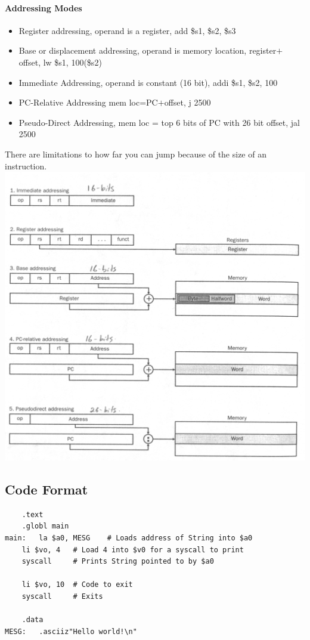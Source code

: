 \documentclass[12 pt]{article}
\begin{document}
\paragraph{Addressing Modes}
\begin{itemize}
\item Register addressing, operand is a register, add \$s1, \$s2, \$s3
\item Base or displacement addressing, operand is memory location, register$+$ offset, lw \$s1, 100(\$s2)
\item Immediate Addressing, operand is constant (16 bit), addi \$s1, \$s2, 100
\item PC-Relative Addressing mem loc=PC$+$offset, j 2500
\item Pseudo-Direct Addressing, mem loc = top 6 bits of PC with 26 bit offset, jal 2500 
\end{itemize}
There are limitations to how far you can jump because of the size of an instruction.
\\ \includegraphics[scale=0.3]{am}
\subsection{Code Format}
\begin{lstlisting}
	.text
	.globl main
main:	la $a0, MESG	# Loads address of String into $a0
	li $vo, 4	# Load 4 into $v0 for a syscall to print
	syscall		# Prints String pointed to by $a0
	
	li $vo, 10	# Code to exit
	syscall		# Exits

	.data
MESG:	.asciiz"Hello world!\n"
\end{lstlisting}
\end{document}
